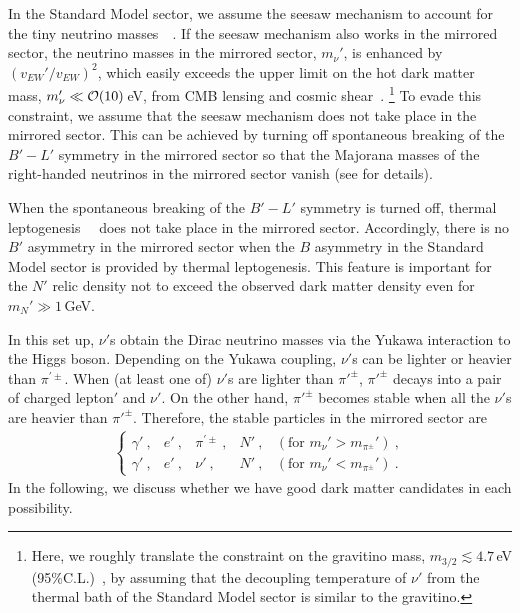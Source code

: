 \documentclass[aps,amsmath,preprint,epsf,superscriptaddress,nofootinbib,notitlepage]{revtex4-1}
\begin{document}
In the Standard Model sector, we assume the seesaw mechanism to account for the tiny neutrino masses~\cite{Yanagida:1979as,Ramond:1979py}~\cite[see also][]{Minkowski:1977sc}.
If the seesaw mechanism also works in the mirrored sector, the neutrino masses in the mirrored sector, $m_\nu'$, is enhanced by $(v_{EW}'/v_{EW})^2$,
which easily exceeds the upper limit on the hot dark matter mass,  $m_\nu' \ll {\cal O}(10)$\,eV, 
from CMB lensing  and cosmic shear~\cite{Osato:2016ixc}.%
\footnote{Here, we roughly translate the constraint on the gravitino mass, $m_{3/2} \lesssim 4.7$\,eV (95\%C.L.)~\cite{Osato:2016ixc},
by assuming that the decoupling temperature of $\nu'$ from the thermal bath of the Standard Model sector is similar to the gravitino.}
To evade this constraint, we assume that the seesaw mechanism does not take place in the mirrored sector. 
This can be achieved by turning off spontaneous breaking of the $B'-L'$ symmetry in the mirrored sector 
so that  the Majorana masses of the right-handed neutrinos in the mirrored sector vanish (see \cite{Fukuda:2015ana}  for details).

When the spontaneous breaking of the $B'-L'$ symmetry is turned off,
thermal leptogenesis~\cite{Fukugita:1986hr}~\cite[see][for review]{Giudice:2003jh,Buchmuller:2005eh,Davidson:2008bu}
does not take place in the mirrored sector. 
Accordingly, there is no $B'$ asymmetry in the mirrored sector when the $B$ asymmetry in the Standard Model sector is provided by thermal leptogenesis.
This feature is important  for the $N'$ relic density not to exceed the observed dark matter density even for $m_{N}' \gg 1$\,GeV.

In this set up, $\nu'$s obtain the Dirac neutrino masses via the Yukawa interaction 
to the Higgs boson.
Depending on the Yukawa coupling, $\nu'$s can be lighter or heavier than $\pi^{\prime\pm}$.
When (at least one of) $\nu'$s are lighter than $\pi'^\pm$, 
$\pi'^\pm$ decays into a pair of charged lepton$'$ and $\nu'$. 
On the other hand, $\pi'^\pm$ becomes 
stable when all the $\nu'$s are heavier than $\pi'^\pm$.
Therefore, the stable particles in the mirrored sector are
\begin{eqnarray}
\left\{
\begin{array}{lllll}
\gamma'\ , &  e' \ , & \pi^{\prime\pm} \ , & N' \ , & ({\mbox{for }}m_\nu' > m_{\pi^\pm}' )\ , \\
\gamma'\ , & e' \ , & \nu' \ , & N'  \ , &  ({\mbox{for }}m_\nu' < m_{\pi^\pm}') \ .
\end{array}
\right.
\end{eqnarray}
In the following, we discuss whether we have good dark matter candidates in each possibility.
\end{document}
